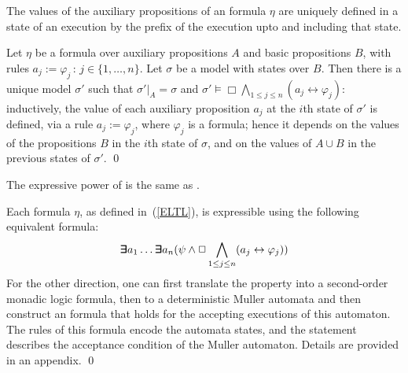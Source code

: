 \begin{lemma} \label{fourone}
The values of the
auxiliary propositions
of an \ELTL{} formula $\eta$
are uniquely defined in a state of an execution
by the prefix of the execution upto and including that state.





\end{lemma}


Let $\eta$ be a formula over auxiliary propositions $A$ and basic propositions $B$,
with rules
$a_j  := \varphi_j \, : \, 
 {j \in \{1, \ldots , n\}}$.
Let $\sigma$ be a model with states over $B$. 
Then there is a unique
model $\sigma'$ such that $\sigma' |_A = \sigma$ and $\sigma' \models \Box \bigwedge_{1 \leq j \leq n} ( a_j \leftrightarrow \varphi_j) $: inductively,
the value of each auxiliary proposition $a_j$ at the $i$th state
of $\sigma'$
is defined, via a rule $ a_j := \varphi_j$, where $\varphi_j$ is a \PLTL{} formula; 
hence it depends on
the values of the propositions $B$
in the $i$th state of $\sigma$, and on the values of $A \cup B$ in the previous states
of $\sigma'$.  \qed


\begin{theorem}
\label{theo1}
The expressive power of 
\ELTL{} is the same as \QLTL{}.
\end{theorem}
Each \ELTL{} formula $\eta$, as defined in~(\ref{ELTL}),
is expressible using the following equivalent \QLTL{} formula:
\[   \bm{\exists}\kern-0.6em\bm{\exists} a_1 \ldots \bm{\exists}\kern-0.6em\bm{\exists} a_n  ( \psi  \wedge   \Box \bigwedge_{1 \leq j \leq n} ( a_j \leftrightarrow \varphi_j))
\]
\noindent
For the other direction, one can  first translate the \QLTL{} property  into
a second-order monadic logic formula, then to a deterministic Muller automata and then construct an \ELTL{} formula that holds for the accepting executions of this automaton. The rules of this formula encode the automata states, and the statement describes the acceptance condition of the Muller automaton.
Details are provided in an appendix. \qed

